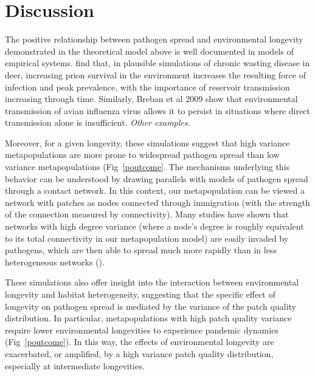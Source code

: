 \documentclass{svjour3}
\begin{document}
\section{Discussion}
\label{discussion} 

The positive relationship between pathogen spread and environmental longevity demonstrated in the theoretical model above is well documented in models of empirical systems.  \cite{Almberg2011} find that, in plausible simulations of chronic wasting disease in deer, increasing prion survival in the environment increases the resulting force of infection and peak prevalence, with the  importance of reservoir transmission increasing through time.  Similarly, Breban et al 2009 show that environmental transmission of avian influenza virus allows it to persist in situations where direct transmission alone is insufficient.  \emph{Other examples.}

Moreover, for a given longevity, these simulations suggest that high variance metapopulations are more prone to widespread pathogen spread than low variance metapopulations (Fig~\ref{poutcome}.  The mechanisms underlying this behavior can be understood by drawing parallels with models of pathogen spread through a contact network.  In this context, our metapopulation can be viewed a network with patches as nodes connected through immigration (with the strength of the connection measured by connectivity).  Many studies have shown that networks with high degree variance (where a node's degree is roughly equivalent to its total connectivity in our metapopulation model) are easily invaded by pathogens, which are then able to spread much more rapidly than in less heterogeneous networks (\cite{Pastor-Satorras2001}).

These simulations also offer insight into the interaction between environmental longevity and habitat heterogeneity, suggesting that the specific effect of longevity on pathogen spread is mediated by the variance of the patch quality distribution.  In particular, metapopulations with high patch quality variance require lower environmental longevities to experience pandemic dynamics (Fig~\ref{poutcome}).  In this way, the effects of environmental longevity are exacerbated, or amplified, by a high variance patch quality distribution, especially at intermediate longevities.  
\end{document}
